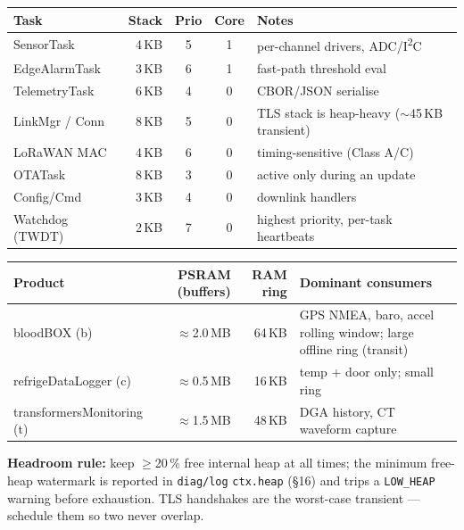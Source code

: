 \begin{center}
\renewcommand{\arraystretch}{1.12}\small
\begin{tabularx}{\textwidth}{@{}l r c c X@{}}
\toprule
\textbf{Task} & \textbf{Stack} & \textbf{Prio} & \textbf{Core} & \textbf{Notes} \\
\midrule
SensorTask      & 4\,KB & 5 & 1 & per-channel drivers, ADC/I\textsuperscript{2}C \\
EdgeAlarmTask   & 3\,KB & 6 & 1 & fast-path threshold eval \\
TelemetryTask   & 6\,KB & 4 & 0 & CBOR/JSON serialise \\
LinkMgr / Conn  & 8\,KB & 5 & 0 & TLS stack is heap-heavy ($\sim$45\,KB transient) \\
LoRaWAN MAC     & 4\,KB & 6 & 0 & timing-sensitive (Class A/C) \\
OTATask         & 8\,KB & 3 & 0 & active only during an update \\
Config/Cmd      & 3\,KB & 4 & 0 & downlink handlers \\
Watchdog (TWDT) & 2\,KB & 7 & 0 & highest priority, per-task heartbeats \\
\bottomrule
\end{tabularx}
\end{center}

\begin{center}
\renewcommand{\arraystretch}{1.12}\small
\begin{tabularx}{\textwidth}{@{}l r r X@{}}
\toprule
\textbf{Product} & \textbf{PSRAM (buffers)} & \textbf{RAM ring} & \textbf{Dominant consumers} \\
\midrule
bloodBOX (b)               & $\approx$2.0\,MB & 64\,KB & GPS NMEA, baro, accel rolling window; large offline ring (transit) \\
refrigeDataLogger (c)      & $\approx$0.5\,MB & 16\,KB & temp + door only; small ring \\
transformersMonitoring (t) & $\approx$1.5\,MB & 48\,KB & DGA history, CT waveform capture \\
\bottomrule
\end{tabularx}
\end{center}
\noindent\textbf{Headroom rule:} keep $\geq$20\,\% free internal heap at all times; the minimum
free-heap watermark is reported in \texttt{diag/log} \texttt{ctx.heap} (\S16) and trips a
\texttt{LOW\_HEAP} warning before exhaustion. TLS handshakes are the worst-case transient — schedule
them so two never overlap.


